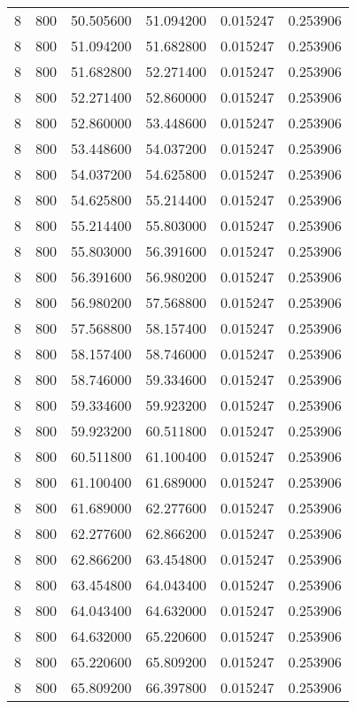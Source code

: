 \begin{longtable}{rrrrrr}
8 & 800 & 50.505600 & 51.094200 & 0.015247 & 0.253906 \\
8 & 800 & 51.094200 & 51.682800 & 0.015247 & 0.253906 \\
8 & 800 & 51.682800 & 52.271400 & 0.015247 & 0.253906 \\
8 & 800 & 52.271400 & 52.860000 & 0.015247 & 0.253906 \\
8 & 800 & 52.860000 & 53.448600 & 0.015247 & 0.253906 \\
8 & 800 & 53.448600 & 54.037200 & 0.015247 & 0.253906 \\
8 & 800 & 54.037200 & 54.625800 & 0.015247 & 0.253906 \\
8 & 800 & 54.625800 & 55.214400 & 0.015247 & 0.253906 \\
8 & 800 & 55.214400 & 55.803000 & 0.015247 & 0.253906 \\
8 & 800 & 55.803000 & 56.391600 & 0.015247 & 0.253906 \\
8 & 800 & 56.391600 & 56.980200 & 0.015247 & 0.253906 \\
8 & 800 & 56.980200 & 57.568800 & 0.015247 & 0.253906 \\
8 & 800 & 57.568800 & 58.157400 & 0.015247 & 0.253906 \\
8 & 800 & 58.157400 & 58.746000 & 0.015247 & 0.253906 \\
8 & 800 & 58.746000 & 59.334600 & 0.015247 & 0.253906 \\
8 & 800 & 59.334600 & 59.923200 & 0.015247 & 0.253906 \\
8 & 800 & 59.923200 & 60.511800 & 0.015247 & 0.253906 \\
8 & 800 & 60.511800 & 61.100400 & 0.015247 & 0.253906 \\
8 & 800 & 61.100400 & 61.689000 & 0.015247 & 0.253906 \\
8 & 800 & 61.689000 & 62.277600 & 0.015247 & 0.253906 \\
8 & 800 & 62.277600 & 62.866200 & 0.015247 & 0.253906 \\
8 & 800 & 62.866200 & 63.454800 & 0.015247 & 0.253906 \\
8 & 800 & 63.454800 & 64.043400 & 0.015247 & 0.253906 \\
8 & 800 & 64.043400 & 64.632000 & 0.015247 & 0.253906 \\
8 & 800 & 64.632000 & 65.220600 & 0.015247 & 0.253906 \\
8 & 800 & 65.220600 & 65.809200 & 0.015247 & 0.253906 \\
8 & 800 & 65.809200 & 66.397800 & 0.015247 & 0.253906 \\

\end{longtable}

